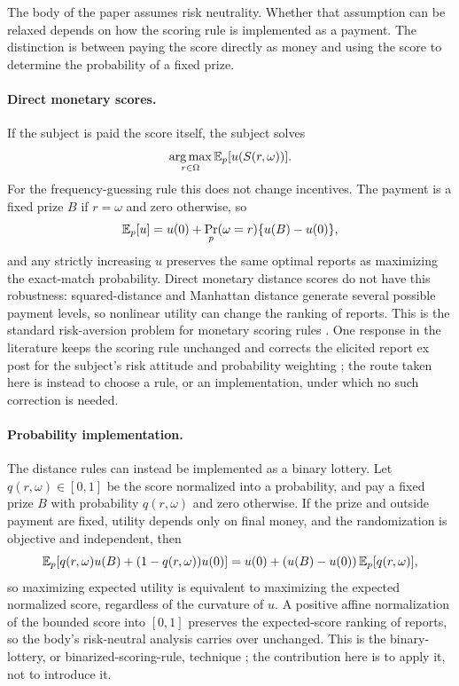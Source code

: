 The body of the paper assumes risk neutrality.
Whether that assumption can be relaxed depends on how the scoring rule is implemented as a payment.
The distinction is between paying the score directly as money and using the score to determine the probability of a fixed prize.

\paragraph{Direct monetary scores.}
If the subject is paid the score itself, the subject solves
\[
\operatorname*{arg\,max}_{r\in\Omega}\mathbb{E}_p[u(S(r,\omega))].
\]
For the frequency-guessing rule this does not change incentives.
The payment is a fixed prize \(B\) if \(r=\omega\) and zero otherwise, so
\[
\mathbb{E}_p[u]=u(0)+\Pr_p(\omega=r)\{u(B)-u(0)\},
\]
and any strictly increasing \(u\) preserves the same optimal reports as maximizing the exact-match probability.
Direct monetary distance scores do not have this robustness: squared-distance and Manhattan distance generate several possible payment levels, so nonlinear utility can change the ranking of reports.
This is the standard risk-aversion problem for monetary scoring rules \citep{ArmantierTreich2012,SchlagEtAl2013}.
One response in the literature keeps the scoring rule unchanged and corrects the elicited report ex post for the subject's risk attitude and probability weighting \citep{Offerman2009}; the route taken here is instead to choose a rule, or an implementation, under which no such correction is needed.

\paragraph{Probability implementation.}
The distance rules can instead be implemented as a binary lottery.
Let \(q(r,\omega)\in[0,1]\) be the score normalized into a probability, and pay a fixed prize \(B\) with probability \(q(r,\omega)\) and zero otherwise.
If the prize and outside payment are fixed, utility depends only on final money, and the randomization is objective and independent, then
\[
\mathbb{E}_p[q(r,\omega)u(B)+(1-q(r,\omega))u(0)]
=
u(0)+(u(B)-u(0))\,\mathbb{E}_p[q(r,\omega)],
\]
so maximizing expected utility is equivalent to maximizing the expected normalized score, regardless of the curvature of \(u\).
A positive affine normalization of the bounded score into \([0,1]\) preserves the expected-score ranking of reports, so the body's risk-neutral analysis carries over unchanged.
This is the binary-lottery, or binarized-scoring-rule, technique \citep{RothMalouf1979,BergEtAl1986,Karni2009,HossainOkui2013}; the contribution here is to apply it, not to introduce it.

